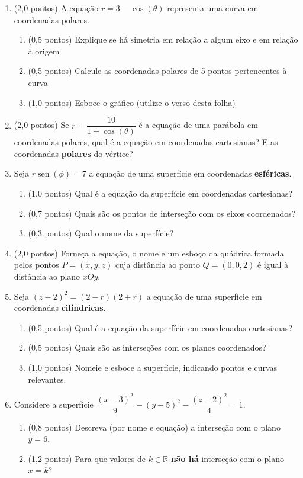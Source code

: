 \documentclass[12pt,a4paper]{article}
\begin{document}
\begin{enumerate}
\item (2,0 pontos) A equação $r = 3-\cos( \theta )$ representa uma curva em coordenadas polares.
\begin{enumerate}
\item (0,5 pontos) Explique se há simetria em relação a algum eixo e em relação à origem
\item (0,5 pontos) Calcule as coordenadas polares de 5 pontos pertencentes à curva
\item (1,0 pontos) Esboce o gráfico (utilize o verso desta folha)
\end{enumerate}

\item (2,0 pontos) Se $r = \dfrac{10}{1+\cos(\theta)}$ é a equação de uma parábola em coordenadas polares, qual é a equação em coordenadas cartesianas? E as coordenadas \textbf{polares} do vértice?

\item Seja $r \operatorname{sen}(\phi) = 7$ a equação de uma superfície em coordenadas \textbf{esféricas}.
\begin{enumerate}
\item (1,0 pontos) Qual é a equação da superfície em coordenadas cartesianas?
\item (0,7 pontos) Quais são os pontos de interseção com os eixos coordenados?
\item (0,3 pontos) Qual o nome da superfície?
\end{enumerate}

\item (2,0 pontos) Forneça a equação, o nome e um esboço da quádrica formada pelos pontos $P = (x, y, z)$ cuja distância ao ponto $Q=(0, 0, 2)$ é igual à distância ao plano $xOy$.

\item Seja $(z-2)^2 = (2-r)(2+r)$ a equação de uma superfície em coordenadas \textbf{cilíndricas}.
\begin{enumerate}
\item (0,5 pontos) Qual é a equação da superfície em coordenadas cartesianas?
\item (0,5 pontos) Quais são as interseções com os planos coordenados?
\item (1,0 pontos) Nomeie e esboce a superfície, indicando pontos e curvas relevantes.
\end{enumerate}

\item Considere a superfície $\dfrac{(x-3)^2}{9} - (y-5)^2 - \dfrac{(z-2)^2}{4} = 1$.
\begin{enumerate}
\item (0,8 pontos) Descreva (por nome e equação) a interseção com o plano $y = 6$.
\item (1,2 pontos) Para que valores de $k \in \mathbb{R}$ \textbf{não há} interseção com o plano $x = k$?
\end{enumerate}
\end{enumerate}
\end{document}
